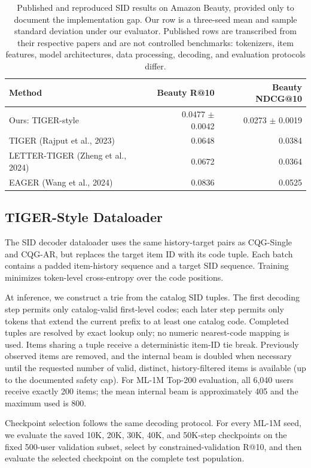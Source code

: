 \documentclass[letterpaper]{article}
\begin{document}
\begin{table}[H]
\centering
\small
\begin{tabular}{lrr}
\toprule
Method & Beauty R@10 & Beauty NDCG@10 \\
\midrule
Ours: TIGER-style & 0.0477 \(\pm\) 0.0042 & 0.0273 \(\pm\) 0.0019 \\
TIGER (Rajput et al., 2023) & 0.0648 & 0.0384 \\
LETTER-TIGER (Zheng et al., 2024) & 0.0672 & 0.0364 \\
EAGER (Wang et al., 2024) & 0.0836 & 0.0525 \\
\bottomrule
\end{tabular}
\caption{Published and reproduced SID results on Amazon Beauty, provided only
to document the implementation gap. Our row is a three-seed mean and sample
standard deviation under our evaluator. Published rows are transcribed from
their respective papers and are not controlled benchmarks: tokenizers, item
features, model architectures, data processing, decoding, and evaluation
protocols differ.}
\label{tab:published-sid}
\end{table}

\subsection{TIGER-Style Dataloader}
\label{app:tiger_dataloader}

The SID decoder dataloader uses the same history-target pairs as CQG-Single
and CQG-AR, but replaces the target item ID with its code tuple. Each batch
contains a padded item-history sequence and a target SID sequence. Training
minimizes token-level cross-entropy over the code positions.

At inference, we construct a trie from the catalog SID tuples. The first
decoding step permits only catalog-valid first-level codes; each later step
permits only tokens that extend the current prefix to at least one catalog
code. Completed tuples are resolved by exact lookup only; no numeric
nearest-code mapping is used. Items sharing a tuple receive a deterministic
item-ID tie break. Previously observed items are removed, and the internal
beam is doubled when necessary until the requested number of valid, distinct,
history-filtered items is available (up to the documented safety cap). For
ML-1M Top-200 evaluation, all 6,040 users receive exactly 200 items; the mean
internal beam is approximately 405 and the maximum used is 800.

Checkpoint selection follows the same decoding protocol. For every ML-1M
seed, we evaluate the saved 10K, 20K, 30K, 40K, and 50K-step checkpoints on
the fixed 500-user validation subset, select by constrained-validation R@10,
and then evaluate the selected checkpoint on the complete test population.
\end{document}
